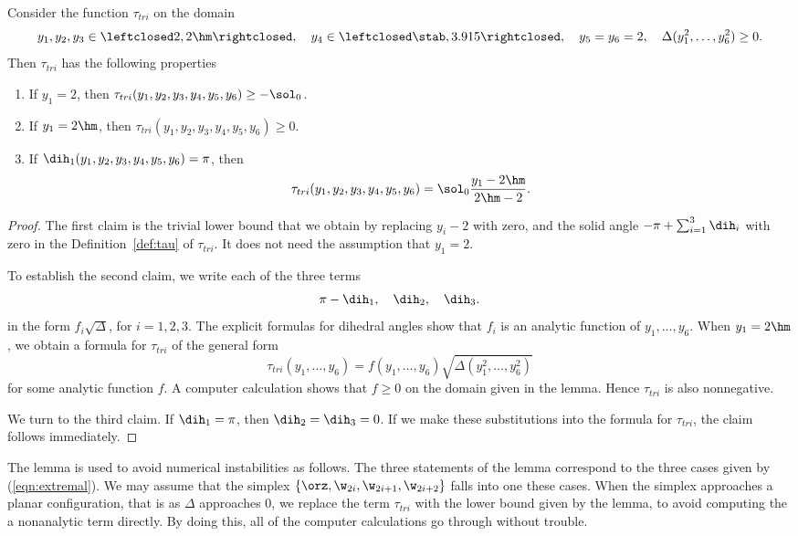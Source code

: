 \begin{lemma}
Consider the function $\tau_{tri}$
on the domain
\[
y_1,y_2,y_3\in\leftclosed 2,2\hm\rightclosed,
\quad y_4\in\leftclosed \stab,3.915\rightclosed,
\quad y_5=y_6=2,\quad
\Delta(y_1^2,\ldots,y_6^2)\ge0.
\]
Then $\tau_{tri}$ has the following properties
\begin{enumerate}
\item If $y_1=2$, then $\tau_{tri}(y_1,y_2,y_3,y_4,y_5,y_6)\ge -\sol_0$.
\item If $y_1=2\hm$, then $\tau_{tri}(y_1,y_2,y_3,y_4,y_5,y_6)\ge 0$.
\item If $\dih_1(y_1,y_2,y_3,y_4,y_5,y_6) =\pi$, then 
  \[
  \tau_{tri}(y_1,y_2,y_3,y_4,y_5,y_6) = \sol_0\dfrac{y_1 -2\hm}{2\hm-2}.
  \]
\end{enumerate}
\end{lemma}

\begin{proof}
The first claim is the trivial lower bound that we obtain by replacing
${y_i -2}$
with zero, and the solid angle $-\pi+\sum_{i=1}^3 \dih_i$ with zero
in the Definition~\ref{def:tau} of $\tau_{tri}$.  It does not need the
assumption that $y_1=2$.

To establish the second claim, we write each of the three terms 
\[
\pi-\dih_1,\quad\dih_2,\quad \dih_3.
\]
in the form $f_i\sqrt{\Delta}$, for $i=1,2,3$.  The explicit formulas
for dihedral angles show that $f_i$ is an analytic function of
$y_1,\ldots,y_6$.  When $y_1=2\hm$, we obtain a formula for
$\tau_{tri}$ of the general form
\[
\tau_{tri}(y_1,\ldots,y_6)= f(y_1,\ldots,y_6)\sqrt{\Delta(y_1^2,\ldots,y_6^2)}
\]
for some analytic function $f$.  A computer calculation shows that $f\ge0$
on the domain given in the lemma. Hence $\tau_{tri}$ is also nonnegative.

We turn to the third claim.  If $\dih_1=\pi$, then $\dih_2=\dih_3=0$.
If we make these substitutions into the formula for $\tau_{tri}$, the
claim follows immediately.
\end{proof}

The lemma is used to avoid numerical instabilities as follows.  The
three statements of the lemma correspond to the three cases given by
(\ref{eqn:extremal}).  We may assume that the simplex
$\{\orz,\w_{2i},\w_{2i+1},\w_{2i+2}\}$ falls into one these cases.
When the simplex approaches a planar configuration, that is as
$\Delta$ approaches $0$, we replace the term $\tau_{tri}$ with the
lower bound given by the lemma, to avoid computing the a nonanalytic
term directly.  By doing this, all of the computer calculations go
through without trouble.
